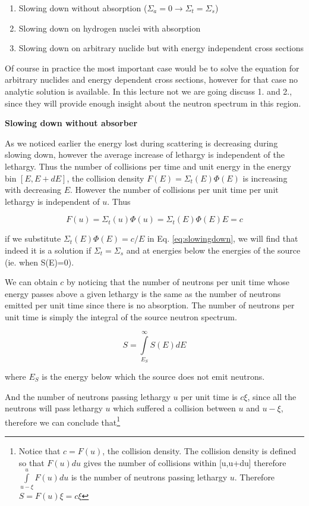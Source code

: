 \begin{enumerate}
\item Slowing down without absorption ($\Sigma_a=0 \rightarrow \Sigma_t=\Sigma_s$)
\item Slowing down on hydrogen nuclei with absorption
\item Slowing down on arbitrary nuclide but with energy independent cross sections
\end{enumerate}

Of course in practice the most important case would be to solve the equation for arbitrary nuclides and energy dependent cross sections, however for that case no analytic solution is available. In this lecture not we are going discuss 1. and 2., since they will provide enough insight about the neutron spectrum in this region.

\vspace{0.5cm}

\textbf{Slowing down without absorber}

As we noticed earlier the energy lost during scattering is decreasing during slowing down, however the average increase of lethargy is independent of the lethargy. Thus the number of collisions per time and unit energy in the energy bin $[E,E+dE]$, the collision density $F(E)=\Sigma_t(E)\Phi(E)$ is increasing with decreasing $E$. However the number of collisions per unit time per unit lethargy is independent of $u$. Thus

$$F(u)=\Sigma_t(u)\Phi(u)=\Sigma_t(E)\Phi(E)E=c$$

\noindent if we substitute $\Sigma_t(E)\Phi(E)=c/E$ in Eq. \eqref{eq:slowingdown}, we will find that indeed it is a solution if $\Sigma_t=\Sigma_s$ and at energies below the energies of the source (ie. when S(E)=0).

We can obtain $c$ by noticing that the number of neutrons per unit time whose energy passes above a given lethargy is the same as the number of neutrons emitted per unit time since there is no absorption. The number of neutrons per unit time is simply the integral of the source neutron spectrum.

$$S=\int\limits_{E_S}^\infty S(E)dE$$

\noindent where $E_S$ is the energy below which the source does not emit neutrons. 

And the number of neutrons passing lethargy $u$ per unit time is $c\xi$, since all the neutrons will pass lethargy $u$ which suffered a collision between $u$ and $u-\xi$, therefore we can conclude that\footnote{Notice that $c=F(u)$, the collision density. The collision density is defined so that $F(u)du$ gives the number of collisions within [u,u+du] therefore $\int\limits_{u-\xi}^u F(u)du$ is the number of neutrons passing lethargy $u$. Therefore $S=F(u)\xi=c\xi$ }

